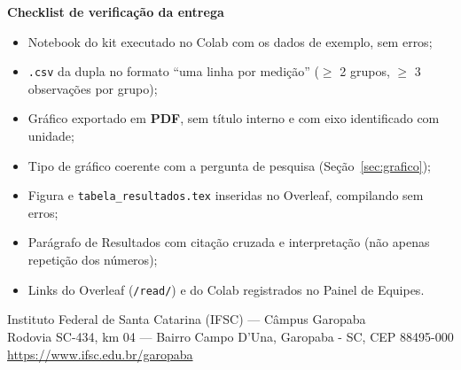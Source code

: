 \documentclass[11pt,a4paper]{article}
\newcommand{\caixaMarcar}{{\color{suave}\faSquare[regular]}}
\begin{document}
\begin{tcolorbox}[enhanced, breakable, colback=verdeVivo!5, colframe=verdeVivo!30, boxrule=0.6pt, arc=8pt, left=14pt, right=14pt, top=10pt, bottom=10pt]
{\color{verde}\bfseries\large\faClipboardCheck\hspace{0.5em}Checklist de verificação da entrega}\par\vspace{4pt}
\begin{itemize}[label={\caixaMarcar}, itemsep=0.4em]
    \item Notebook do kit executado no Colab com os dados de exemplo, sem erros;
    \item \texttt{.csv} da dupla no formato ``uma linha por medição'' ($\geq$ 2 grupos, $\geq$ 3 observações por grupo);
    \item Gráfico exportado em \textbf{PDF}, sem título interno e com eixo identificado com unidade;
    \item Tipo de gráfico coerente com a pergunta de pesquisa (Seção~\ref{sec:grafico});
    \item Figura e \texttt{tabela\_resultados.tex} inseridas no Overleaf, compilando sem erros;
    \item Parágrafo de Resultados com citação cruzada e interpretação (não apenas repetição dos números);
    \item Links do Overleaf (\texttt{/read/}) e do Colab registrados no Painel de Equipes.
\end{itemize}
\end{tcolorbox}

\vfill
\begin{center}
    \footnotesize\color{suave}
    Instituto Federal de Santa Catarina (IFSC) — Câmpus Garopaba\\
    Rodovia SC-434, km 04 — Bairro Campo D'Una, Garopaba - SC, CEP 88495-000\\
    \url{https://www.ifsc.edu.br/garopaba}
\end{center}
\end{document}

